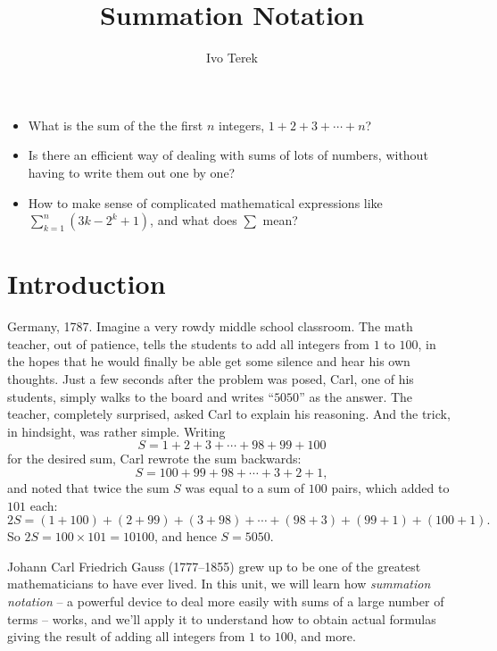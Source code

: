 \documentclass[nooutcomes]{ximera}
\author{Ivo Terek}
\title{Summation Notation}
\begin{document}
\begin{abstract}
  
\end{abstract}
\maketitle

\begin{motivatingQuestions}\begin{itemize}
  \item What is the sum of the the first $n$ integers, $1+2+3+\cdots + n$?
  \item Is there an efficient way of dealing with sums of lots of numbers, without having to write them out one by one?
  \item How to make sense of complicated mathematical expressions like $\sum_{k=1}^n (3k-2^k+1)$, and what does $\sum$ mean?
\end{itemize}\end{motivatingQuestions}

\section{Introduction}

Germany, 1787. Imagine a very rowdy middle school classroom. The math teacher, out of patience, tells the students to add all integers from $1$ to $100$, in the hopes that he would finally be able get some silence and hear his own thoughts. Just a few seconds after the problem was posed, Carl, one of his students, simply walks to the board and writes ``$5050$'' as the answer. The teacher, completely surprised, asked Carl to explain his reasoning. And the trick, in hindsight, was rather simple. Writing $$S=1+2+3+\cdots + 98+99+100$$for the desired sum, Carl rewrote the sum backwards: $$S = 100+99+98+\cdots+3+2+1,$$and noted that twice the sum $S$ was equal to a sum of $100$ pairs, which added to $101$ each: $$2S = (1+100)+(2+99)+(3+98)+\cdots +(98+3)+(99+1)+(100+1).$$So $2S = 100 \times 101  =10100$, and hence $S=5050$.

Johann Carl Friedrich Gauss (1777--1855) grew up to be one of the greatest mathematicians to have ever lived. In this unit, we will learn how \emph{summation notation} -- a powerful device to deal more easily with sums of a large number of terms -- works, and we'll apply it to understand how to obtain actual formulas giving the result of adding all integers from $1$ to $100$, and more.
\end{document}
